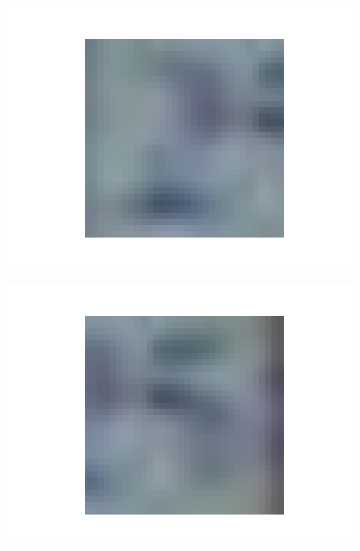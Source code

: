 \documentclass[14pt,a4paper]{extarticle}
\begin{document}
\begin{figure}[htb]
\begin{subfigure}[b]{0.3\textwidth}
    \includegraphics[width=\textwidth]{../res/svhn/sample_4.png}
    \label{fig:svhn_sample_4}
  \end{subfigure}
  \hfill
  \begin{subfigure}[b]{0.3\textwidth}
    \includegraphics[width=\textwidth]{../res/svhn/sample_5.png}
    \label{fig:svhn_sample_5}
  \end{subfigure}
  \hfill
  \begin{subfigure}[b]{0.3\textwidth}

\end{subfigure}
\end{figure}
\end{document}
